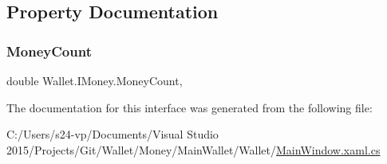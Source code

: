 \subsection{Property Documentation}
\hypertarget{interface_wallet_1_1_i_money_aaaa21af85790646a6b0ff5021df66ea6}{}\label{interface_wallet_1_1_i_money_aaaa21af85790646a6b0ff5021df66ea6} 
\subsubsection{\texorpdfstring{Money\+Count}{MoneyCount}}
{\footnotesize\ttfamily double Wallet.\+I\+Money.\+Money\+Count\hspace{0.3cm}{\ttfamily [get]}, {\ttfamily [set]}}



The documentation for this interface was generated from the following file\+:\begin{DoxyCompactItemize}
\item 
C\+:/\+Users/s24-\/vp/\+Documents/\+Visual Studio 2015/\+Projects/\+Git/\+Wallet/\+Money/\+Main\+Wallet/\+Wallet/\hyperlink{_main_window_8xaml_8cs}{Main\+Window.\+xaml.\+cs}\end{DoxyCompactItemize}
